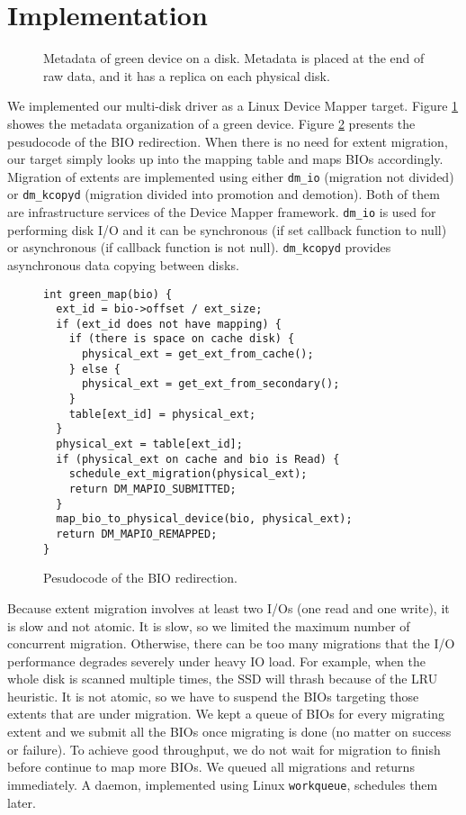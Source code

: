 \section{Implementation}
\label{sec:implementation}

\begin{figure}[t]
\begin{centering}
\caption{Metadata of green device on a disk. Metadata is placed at the
end of raw data, and it has a replica on each physical disk.}
\label{fig:metadata}
\end{centering}
\end{figure}


We implemented our multi-disk driver as a Linux Device Mapper target.
Figure \ref{fig:metadata} showes the metadata organization of a green
device. Figure \ref{fig:rwpath} presents the pesudocode of the BIO
redirection. When there is no need for extent migration, our target
simply looks up into the mapping table and maps BIOs accordingly.
Migration of extents are implemented using either \texttt{dm\_io}
(migration not divided) or \texttt{dm\_kcopyd} (migration divided into
promotion and demotion).  Both of them are infrastructure services of
the Device Mapper framework.  \texttt{dm\_io} is used for performing
disk I/O and it can be synchronous (if set callback function to null)
or asynchronous (if callback function is not null).
\texttt{dm\_kcopyd} provides asynchronous data copying between disks. 

\begin{figure}[t]
{\footnotesize 
\begin{verbatim}
int green_map(bio) {
  ext_id = bio->offset / ext_size;
  if (ext_id does not have mapping) {
    if (there is space on cache disk) {
      physical_ext = get_ext_from_cache();
    } else {
      physical_ext = get_ext_from_secondary();
    }
    table[ext_id] = physical_ext;
  } 
  physical_ext = table[ext_id];
  if (physical_ext on cache and bio is Read) {
    schedule_ext_migration(physical_ext);
    return DM_MAPIO_SUBMITTED;
  } 
  map_bio_to_physical_device(bio, physical_ext);
  return DM_MAPIO_REMAPPED;
}
\end{verbatim}
}
\caption{Pesudocode of the BIO redirection.} 
\label{fig:rwpath}
\end{figure}


Because extent migration involves at least two I/Os (one read and one
write), it is slow and not atomic. It is slow, so we limited the
maximum number of concurrent migration. Otherwise, there can be too
many migrations that the I/O performance degrades severely under heavy
IO load. For example, when the whole disk is scanned
multiple times, the SSD will thrash because of the LRU heuristic. It
is not atomic, so we have to suspend the BIOs targeting those extents that
are under migration. We kept a queue of BIOs for every migrating
extent and we submit all the BIOs once migrating is done (no matter on
success or failure). To achieve good throughput, we do not wait for
migration to finish before continue to map more BIOs. We queued all
migrations and returns immediately. A daemon, implemented using Linux
\texttt{workqueue}, schedules them later.

